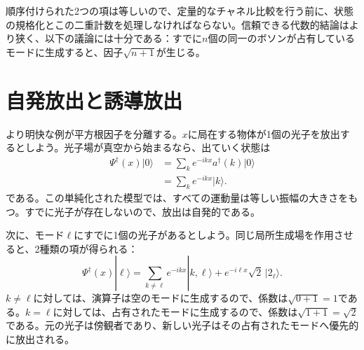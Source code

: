 \begin{classroomqa}
\end{classroomqa}

順序付けられた2つの項は等しいので、定量的なチャネル比較を行う前に、状態の規格化とこの二重計数を処理しなければならない。信頼できる代数的結論はより狭く、以下の議論には十分である：すでに\(n\)個の同一のボソンが占有しているモードに生成すると、因子\(\sqrt{n+1}\)が生じる。

\section{自発放出と誘導放出}

より明快な例が平方根因子を分離する。\(x\)に局在する物体が1個の光子を放出するとしよう。光子場が真空から始まるなら、出ていく状態は
\begin{align}
\Psi^\dagger(x)|0\rangle
&=\sum_k e^{-ikx}a^\dagger(k)|0\rangle\\
&=\sum_k e^{-ikx}|k\rangle.
\end{align}
である。この単純化された模型では、すべての運動量は等しい振幅の大きさをもつ。すでに光子が存在しないので、放出は自発的である。

次に、モード\(\ell\)にすでに1個の光子があるとしよう。同じ局所生成場を作用させると、2種類の項が得られる：
\begin{equation}
\Psi^\dagger(x)|\ell\rangle
=
\sum_{k\ne\ell}e^{-ikx}|k,\ell\rangle
+e^{-i\ell x}\sqrt{2}\,|2_\ell\rangle.
\end{equation}
\(k\ne\ell\)に対しては、演算子は空のモードに生成するので、係数は\(\sqrt{0+1}=1\)である。\(k=\ell\)に対しては、占有されたモードに生成するので、係数は\(\sqrt{1+1}=\sqrt{2}\)である。元の光子は傍観者であり、新しい光子はその占有されたモードへ優先的に放出される。

\begin{classroomqa}
\end{classroomqa}


